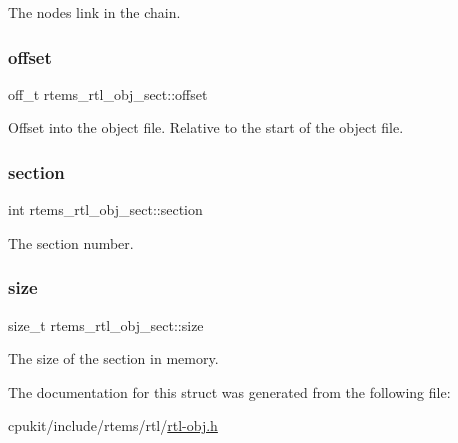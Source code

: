 The node\textquotesingle{}s link in the chain. \mbox{\label{structrtems__rtl__obj__sect_a0b4dabc29722d66802e1c57f9ac3f064}} 
\subsubsection{\texorpdfstring{offset}{offset}}
{\footnotesize\ttfamily off\+\_\+t rtems\+\_\+rtl\+\_\+obj\+\_\+sect\+::offset}

Offset into the object file. Relative to the start of the object file. \mbox{\label{structrtems__rtl__obj__sect_a4316836ed0e81dd217e51bf819643cf9}} 
\subsubsection{\texorpdfstring{section}{section}}
{\footnotesize\ttfamily int rtems\+\_\+rtl\+\_\+obj\+\_\+sect\+::section}

The section number. \mbox{\label{structrtems__rtl__obj__sect_ad415a9c050534349dfce362f840cb3f5}} 
\subsubsection{\texorpdfstring{size}{size}}
{\footnotesize\ttfamily size\+\_\+t rtems\+\_\+rtl\+\_\+obj\+\_\+sect\+::size}

The size of the section in memory. 

The documentation for this struct was generated from the following file\+:\begin{DoxyCompactItemize}
\item 
cpukit/include/rtems/rtl/\mbox{\hyperlink{rtl-obj_8h}{rtl-\/obj.\+h}}\end{DoxyCompactItemize}
